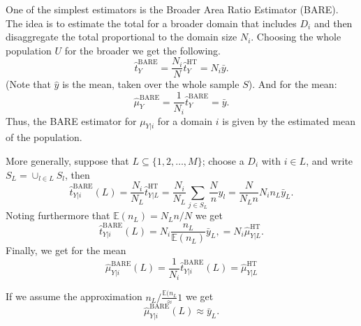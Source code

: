 \documentclass[fleqn,11pt]{article}
\begin{document}
One of the simplest estimators is the Broader Area Ratio Estimator (BARE). The
idea is to estimate the total for a broader domain that includes $D_i$ and then
disaggregate the total proportional to the domain size $N_i$. Choosing the
whole population $U$ for the broader we get the following.
$$
\hat{t}^{\textrm{BARE}}_Y = \frac{N_i}{N}\hat{t}^{\textrm{HT}}_Y = N_i\bar{y}.
$$
(Note that $\hat{y}$ is the mean, taken over the whole sample $S$). And for the
mean:
$$
\hat{\mu}^{\textrm{BARE}}_Y  = \frac{1}{N_i}\hat{t}^{\textrm{BARE}}_Y  = \bar{y}.
$$
Thus, the BARE estimator for $\mu_{Y|i}$ for a domain $i$ is given by the
estimated mean of the population.

More generally, suppose that $L\subseteq \{1,2,\ldots,M\}$; choose a $D_i$
with $i\in L$, and write $S_L = \cup_{l\in L}{S_l}$, then
%
$$
\hat{t}^{\textrm{BARE}}_{Y|i}(L) 
= \frac{N_i}{N_L}\hat{t}^{\textrm{HT}}_{Y|L}
=\frac{N_i}{N_L}\sum_{j\in S_L}\frac{N}{n}y_l 
= \frac{N}{N_L n}N_i n_L\bar{y}_L.
$$ 
Noting furthermore that $\mathbb{E}(n_L)=N_Ln/N$ we get
$$
\hat{t}^{\textrm{BARE}}_{Y|i}(L)= N_i\frac{n_L}{\mathbb{E}(n_L)}\bar{y}_L,
= N_i \hat{\mu}^{\textrm{HT}}_{Y|L}.
$$
Finally, we get for the mean
$$
\hat{\mu}^{\textrm{BARE}}_{Y|i}(L) 
= \frac{1}{N_i}\hat{t}^{\textrm{BARE}}_{Y|i}(L)
= \hat{\mu}^{\textrm{HT}}_{Y|L}
$$

If we assume the approximation $n_L/\frac{\mathbb{E}(n_L}\approx 1$ we 
get
$$
\hat{\mu}^{\textrm{BARE}}_{Y|i}(L)\approx \bar{y}_L.
$$
\end{document}
